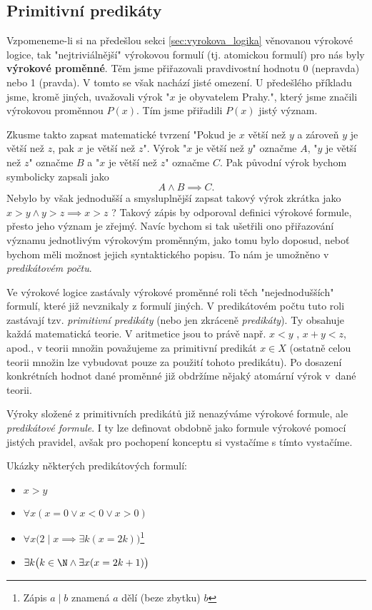 \subsection{Primitivní predikáty}\label{subsec:primitivni_predikaty}
Vzpomeneme-li si na předešlou sekci \ref{sec:vyrokova_logika} věnovanou výrokové logice, tak "nejtriviálnější" výrokovou formulí (tj. atomickou formulí) pro nás byly \textbf{výrokové proměnné}. Těm jsme přiřazovali pravdivostní hodnotu 0 (nepravda) nebo 1 (pravda). V tomto se však nachází jisté omezení. U předešlého příkladu jsme, kromě jiných, uvažovali výrok "$x$ je obyvatelem Prahy.", který jsme značili výrokovou proměnnou $P(x)$. Tím jsme přiřadili $P(x)$ jistý význam.\par
Zkusme takto zapsat matematické tvrzení "Pokud je $x$ větší než $y$ a zároveň $y$ je větší než $z$, pak $x$ je větší než $z$". Výrok "$x$ je větší než $y$" označme $A$, "$y$ je větší než $z$" označme $B$ a "$x$ je větší než $z$" označme $C$. Pak původní výrok bychom symbolicky zapsali jako
\begin{equation*}
    A \land B \implies C.
\end{equation*}
Nebylo by však jednodušší a smysluplnější zapsat takový výrok zkrátka jako $x>y \land y>z \implies x>z$ ? Takový zápis by odporoval definici výrokové formule, přesto jeho význam je zřejmý. Navíc bychom si tak ušetřili ono přiřazování významu jednotlivým výrokovým proměnným, jako tomu bylo doposud, neboť bychom měli možnost jejich syntaktického popisu. To nám je umožněno v \emph{predikátovém počtu}.\par
Ve výrokové logice zastávaly výrokové proměnné roli těch "nejednodušších" formulí, které již nevznikaly z formulí jiných. V predikátovém počtu tuto roli zastávají tzv. \emph{primitivní predikáty} (nebo jen zkráceně \emph{predikáty}). Ty obsahuje každá matematická teorie. V aritmetice jsou to právě např. $x<y$ , $x+y<z$, apod., v teorii množin považujeme za primitivní predikát $x\in X$ (ostatně celou teorii množin lze vybudovat pouze za použití tohoto predikátu). Po dosazení konkrétních hodnot dané proměnné již obdržíme nějaký atomární výrok v~dané teorii.\par
Výroky složené z primitivních predikátů již nenazýváme výrokové formule, ale \emph{predikátové formule}. I ty lze definovat obdobně jako formule výrokové pomocí jistých pravidel, avšak pro pochopení konceptu si vystačíme s tímto vystačíme.
\begin{example}
    Ukázky některých predikátových formulí:
    \begin{itemize}
        \item $x>y$
        \item $\forall x (x = 0 \lor x < 0 \lor x > 0)$
        \item $\forall x \bigl(2 \mid x \implies \exists k (x=2k)\bigr)$\footnote{Zápis $a \mid b$ znamená $a$ dělí (beze zbytku) $b$}
        \item $\exists k \bigl(k \in \N \land \exists x (x=2k+1)\bigr)$
    \end{itemize}
\end{example}

